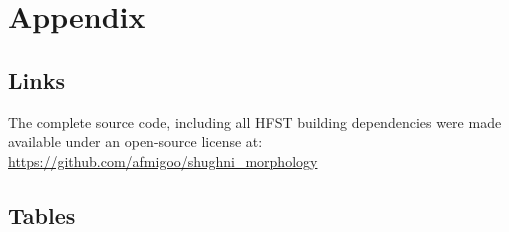\newpage
\section*{Appendix}
\subsection*{Links}
\label{github_repo}
The complete source code, including all HFST building dependencies were made available under an open-source license at:
\url{https://github.com/afmigoo/shughni_morphology}

\newpage
\subsection*{Tables}
